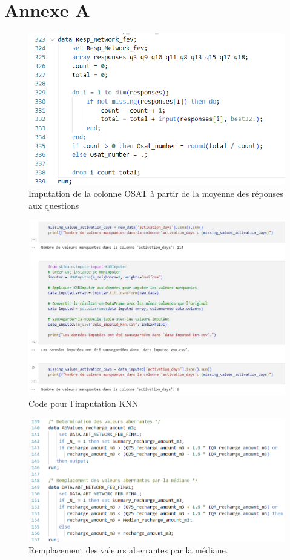\chapter*{Annexe A}
\adjustmtc
\thispagestyle{MyStyle}

\makeatletter\renewcommand{}\makeatother

\appendix

\begin{figure}[H]
    \centering
    \includegraphics[width=0.6\linewidth]{capture_sas_1.png}
    \caption{Imputation de la colonne OSAT à partir de la moyenne des réponses aux questions}
    \label{imputation_code}
\end{figure}

\begin{figure}[H]
    \centering
    \includegraphics[width=0.8\linewidth]{capture_sas_6.png}
    \caption{Code pour l'imputation KNN}
    \label{fig:knn_code}
\end{figure}

\begin{figure}[H] 
    \centering 
    \includegraphics[width=0.7\linewidth]{capture_sas_7.png} 
    \caption{Remplacement des valeurs aberrantes par la médiane.}
    \label{fig:aberrant_values}
\end{figure}

